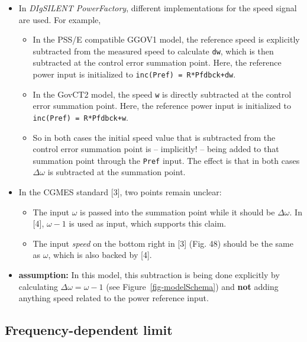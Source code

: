 \documentclass[
  a4paper,
  DIV=11,
  numbers=noendperiod]{scrartcl}
\providecommand{\tightlist}{%
  \setlength{\itemsep}{0pt}\setlength{\parskip}{0pt}}\usepackage{longtable,booktabs,array}
\begin{document}
\begin{itemize}
\tightlist
\item
  In \emph{DIgSILENT PowerFactory}, different implementations for the
  speed signal are used. For example,

  \begin{itemize}
  \tightlist
  \item
    In the PSS/E compatible GGOV1 model, the reference speed is
    explicitly subtracted from the measured speed to calculate
    \texttt{dw}, which is then subtracted at the control error summation
    point. Here, the reference power input is initialized to
    \texttt{inc(Pref)\ =\ R*Pfdbck+dw}.
  \item
    In the GovCT2 model, the speed \texttt{w} is directly subtracted at
    the control error summation point. Here, the reference power input
    is initialized to \texttt{inc(Pref)\ =\ R*Pfdbck+w}.
  \item
    So in both cases the initial speed value that is subtracted from the
    control error summation point is -- implicitly! -- being added to
    that summation point through the \texttt{Pref} input. The effect is
    that in both cases \(\Delta \omega\) is subtracted at the summation
    point.
  \end{itemize}
\item
  In the CGMES standard {[}3{]}, two points remain unclear:

  \begin{itemize}
  \tightlist
  \item
    The input \(\omega\) is passed into the summation point while it
    should be \(\Delta \omega\). In {[}4{]}, \(\omega - 1\) is used as
    input, which supports this claim.
  \item
    The input \emph{speed} on the bottom right in {[}3{]} (Fig. 48)
    should be the same as \(\omega\), which is also backed by {[}4{]}.
  \end{itemize}
\item
  \textbf{assumption:} In this model, this subtraction is being done
  explicitly by calculating \(\Delta \omega = \omega - 1\) (see
  Figure~\ref{fig-modelSchema}) and \textbf{not} adding anything speed
  related to the power reference input.
\end{itemize}

\subsection{Frequency-dependent limit}\label{frequency-dependent-limit}
\end{document}

